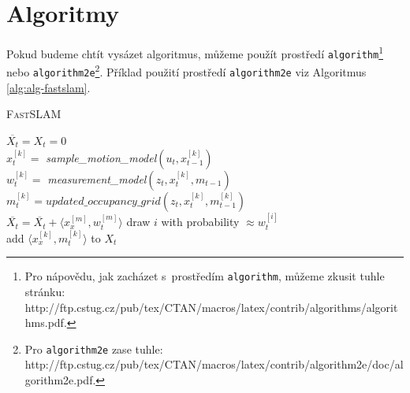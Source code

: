 \documentclass[a4paper,11pt]{article}
\begin{document}
\section{Algoritmy} \label{sec-alg}
Pokud budeme chtít vysázet algoritmus, můžeme použít prostředí \texttt{algorithm}\footnote{Pro nápovědu, jak zacházet s~prostředím \texttt{algorithm}, můžeme zkusit tuhle stránku: \\ http://ftp.cstug.cz/pub/tex/CTAN/macros/latex/contrib/algorithms/algorithms.pdf.} nebo \texttt{algorithm2e}\footnote{Pro \texttt{algorithm2e} zase tuhle: http://ftp.cstug.cz/pub/tex/CTAN/macros/latex/contrib/algorithm2e/doc/algorithm2e.pdf.}. Příklad použití prostředí \texttt{algorithm2e} viz Algoritmus \ref{alg:alg-fastslam}.
\bigskip

\begin{algorithm}[H]
\caption{\textsc{Fast}SLAM}
\label{alg:alg-fastslam}
\SetNlSty{}{}{:  } 
\SetInd{1em}{1em}
\SetNlSkip{-1.35em}

\BlankLine
\Indp
    $\overline{X_t} = X_t = 0$\\
    { 
        $x_t^{[k]} =$ \emph{sample\_motion\_model}$(u_t,x_{t-1}^{[k]})$\\
        $w_t^{[k]} =$ \emph{measurement\_model}$(z_t,x_t^{[k]},m_{t-1})$\\
        $m_t^{[k]} = updated\_occupancy\_grid(z_t,x_t^{[k]},m_{t-1}^{[k]})$\\
        $\overline{X_t} = \overline{X_t} + \langle x_x^{[m]},w_t^{[m]}\rangle$
    }
    {
        draw $i$ with probability $\approx w_t^{[i]}$\\
        add $\langle x_x^{[k]},m_t^{[k]}\rangle$ to $X_t$\\
    }
\end{algorithm}
\bigskip
\end{document}
